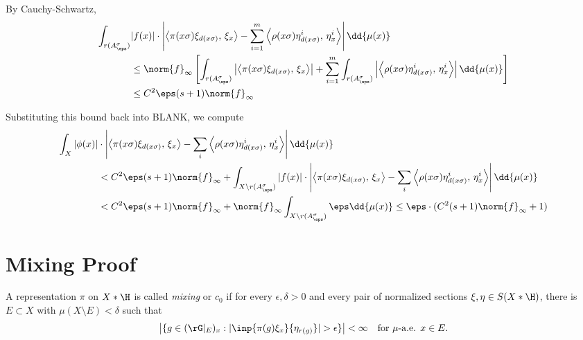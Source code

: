 \documentclass[12pt]{article}
\begin{document}
By Cauchy-Schwartz,
\begin{align*}
    \int_{r(A^{\sigma}_{\eps})}&| f(x)| \cdot\left| \left\langle\pi(x \sigma) \xi_{d(x \sigma)},\,\xi_{x}\right\rangle - \sum_{i=1}^{m}  \left\langle\rho(x \sigma) \eta^{i}_{d(x \sigma)},\,\eta^{i}_{x}\right\rangle\right|\dd{\mu(x)} \\
    &\leq  \norm{f}_{\infty} \left[\int_{r(A^{\sigma}_{\eps})}\left| \left\langle\pi(x \sigma) \xi_{d(x \sigma)},\,\xi_{x}\right\rangle\right| + \sum_{i=1}^{m}\int_{r(A_{\eps}^{\sigma})}  \left|\left\langle\rho(x \sigma) \eta^{i}_{d(x \sigma)},\,\eta^{i}_{x}\right\rangle\right|\dd{\mu(x)}\right] \\
    &\leq C^{2}\eps(s+1) \norm{f}_{\infty}
\end{align*}


Substituting this bound back into BLANK, we compute
\begin{align*}
    \int_{X}| \phi(x)|& \cdot\left| \left\langle\pi(x \sigma) \xi_{d(x \sigma)},\,\xi_{x}\right\rangle - \sum_{i}  \left\langle\rho(x \sigma) \eta^{i}_{d(x \sigma)},\,\eta^{i}_{x}\right\rangle\right|\dd{\mu(x)} \\
    &< C^{2}\eps(s+1) \norm{f}_{\infty} + \int_{X\setminus r(A_{\eps}^{\sigma})}| f(x)| \cdot\left| \left\langle\pi(x \sigma) \xi_{d(x \sigma)},\,\xi_{x}\right\rangle - \sum_{i}  \left\langle\rho(x \sigma) \eta^{i}_{d(x \sigma)},\,\eta^{i}_{x}\right\rangle\right|\dd{\mu(x)} \\
    &< C^{2}\eps(s+1) \norm{f}_{\infty} + \norm{f}_{\infty} \int_{X\setminus r(A_{\eps}^{\sigma})} \eps\dd{\mu(x)}  \leq \eps \cdot(C^{2}(s+1) \norm{f}_{\infty}+1)
\end{align*}


\section{Mixing Proof}
\begin{definition}
 A representation $\pi$ on $X \ast \H$ is called {\it mixing} or $c_0$ if 
for every $\epsilon, \delta > 0$ and every pair of normalized sections $\xi, \eta \in S(X \ast \H)$, there is $E \subset X$ with $\mu(X \setminus E) < \delta$ such that 
$$
\left|\{g \in (\rG\vert_E)_x : |\inp{\pi(g)\xi_x}{\eta_{r(g)}}| > \epsilon\}\right| < \infty  \quad \text{for $\mu$-a.e. $x \in E$.}
$$
\end{definition}
\end{document}
